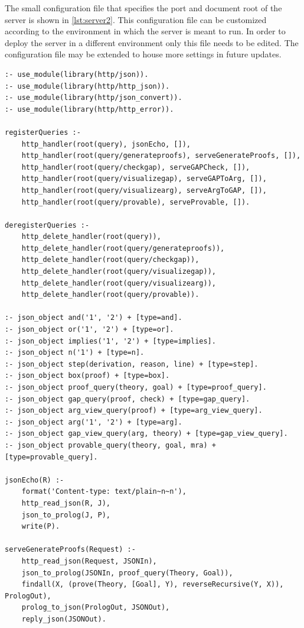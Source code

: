 \documentclass[11pt,twoside,a4paper]{report}
\begin{document}
The small configuration file that specifies the port and document root of the server is shown in \autoref{lst:server2}. This configuration file can be customized according to the environment in which the server is meant to run. In order to deploy the server in a different environment only this file needs to be edited. The configuration file may be extended to house more settings in future updates.

\begin{lstlisting}[caption={The server code file that registers handlers that server client queries},label=lst:server3]
:- use_module(library(http/json)).
:- use_module(library(http/http_json)).
:- use_module(library(http/json_convert)).
:- use_module(library(http/http_error)).

registerQueries :- 
	http_handler(root(query), jsonEcho, []),
	http_handler(root(query/generateproofs), serveGenerateProofs, []),
	http_handler(root(query/checkgap), serveGAPCheck, []),
	http_handler(root(query/visualizegap), serveGAPToArg, []),
	http_handler(root(query/visualizearg), serveArgToGAP, []),
	http_handler(root(query/provable), serveProvable, []).

deregisterQueries :- 
	http_delete_handler(root(query)),
	http_delete_handler(root(query/generateproofs)),
	http_delete_handler(root(query/checkgap)),
	http_delete_handler(root(query/visualizegap)),
	http_delete_handler(root(query/visualizearg)),
	http_delete_handler(root(query/provable)).

:- json_object and('1', '2') + [type=and].
:- json_object or('1', '2') + [type=or].
:- json_object implies('1', '2') + [type=implies].
:- json_object n('1') + [type=n].
:- json_object step(derivation, reason, line) + [type=step].
:- json_object box(proof) + [type=box].
:- json_object proof_query(theory, goal) + [type=proof_query].
:- json_object gap_query(proof, check) + [type=gap_query].
:- json_object arg_view_query(proof) + [type=arg_view_query].
:- json_object arg('1', '2') + [type=arg].
:- json_object gap_view_query(arg, theory) + [type=gap_view_query].
:- json_object provable_query(theory, goal, mra) + [type=provable_query].

jsonEcho(R) :-
	format('Content-type: text/plain~n~n'),
	http_read_json(R, J),
	json_to_prolog(J, P),
	write(P).
	
serveGenerateProofs(Request) :-
	http_read_json(Request, JSONIn),
	json_to_prolog(JSONIn, proof_query(Theory, Goal)),
	findall(X, (prove(Theory, [Goal], Y), reverseRecursive(Y, X)), PrologOut),
	prolog_to_json(PrologOut, JSONOut),
	reply_json(JSONOut).


\end{lstlisting}
\end{document}
